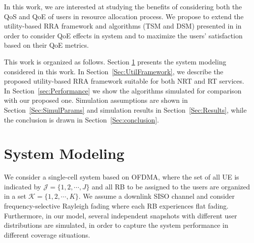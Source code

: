 \documentclass[12pt]{article}
\newcommand{\SecRef}[1]{Section~\ref{#1}}
\begin{document}
In this work, we are interested at studying the benefits of considering both the \ac{QoS} and \ac{QoE} of users in resource allocation process. We propose to extend the utility-based \ac{RRA} framework and algorithms (\ac{TSM} and \ac{DSM}) presented in \cite{Rodrigues2014_Wiley} in order to consider \ac{QoE} effects in system and to maximize the users' satisfaction based on their \ac{QoE} metrics.


This work is organized as follows. Section \ref{Sec:SystemModeling} presents the system modeling considered in this work. In \SecRef{Sec:UtilFramework}, we describe the proposed utility-based \ac{RRA} framework suitable for both \ac{NRT} and \ac{RT} services. In \SecRef{sec:Performance} we show the algorithms simulated for comparison with our proposed one. Simulation assumptions are shown in \SecRef{Sec:SimulParams} and simulation results in \SecRef{Sec:Results}, while the conclusion is drawn in \SecRef{Sec:conclusion}.

\section{System Modeling}
\label{Sec:SystemModeling}
We consider a single-cell system based on \ac{OFDMA}, where the set of all \ac{UE} is indicated by $\mathcal{J} = \{1, 2, \cdots, J\}$ and all \ac{RB} to be assigned to the users are organized in a set $\mathcal{K} = \{1, 2, \cdots, K\}$.
We assume a downlink \ac{SISO} channel and consider frequency-selective Rayleigh fading where each \ac{RB} experiences flat fading. Furthermore, in our model, several independent snapshots with different user distributions are simulated, in order to capture the system performance in different coverage situations.
%

%
\end{document}
